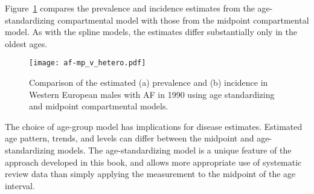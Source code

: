Figure~\ref{fig:app-af compare} compares the prevalence and incidence
estimates from the age-standardizing compartmental model with those from the
midpoint compartmental model.  As with the spline models, the
estimates differ substantially only in the oldest ages.

    \begin{figure}[h]
        \begin{center}
            \texttt{[image: af-mp\_v\_hetero.pdf]}
            \caption[Comparison of prevalence and incidence estimates for
              atrial fibrillation using an age-standardizing model and midpoint model.]{Comparison of the estimated (a) prevalence and (b) incidence
              in Western European males with AF in 1990
              using age standardizing and midpoint compartmental models.}
            \label{fig:app-af compare}
        \end{center}
    \end{figure}

The choice of age-group model has implications for disease estimates.
Estimated age pattern, trends, and levels can differ between the
midpoint and age-standardizing models.  The age-standardizing model is a
unique feature of the approach developed in this book,
and allows more appropriate use of systematic review data than simply
applying the measurement to the midpoint of the age interval.
